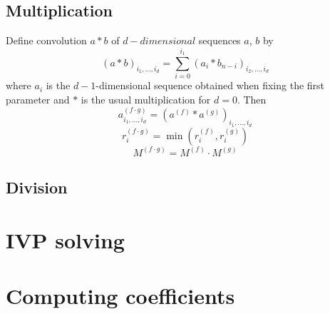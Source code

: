 \documentclass[]{article}
\begin{document}
\subsection{Multiplication}
Define convolution $a * b$ of $d-dimensional$ sequences $a$, $b$ by 
$$ (a * b)_{i_1, \dots, i_d} = \sum_{i=0}^{i_1} (a_i * b_{n-i})_{i_2, \dots, i_d} $$
where $a_i$ is the $d-1$-dimensional sequence obtained when fixing the first parameter and $*$ is the usual multiplication for $d=0$.
Then
$$a^{(f \cdot g)}_{i_1,\dots,i_d} = (a^{(f)}*a^{(g)})_{i_1, \dots, i_d}$$
$$r_i^{(f \cdot g)} = \min(r_i^{(f)}, r_i^{(g)}) $$
$$M^{(f \cdot g)} = M^{(f)} \cdot M^{(g)}$$
\subsection{Division}
\section{IVP solving}
\section{Computing coefficients}
\end{document}
